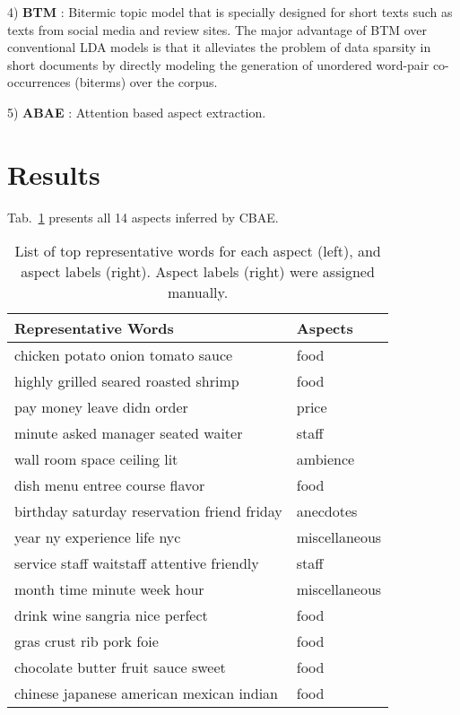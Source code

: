 \documentclass{article}
\begin{document}
4) \textbf{BTM} \cite{Yan2013}: Bitermic topic model that is specially designed for short texts such as texts from social media and review sites. The major advantage of BTM over conventional LDA models is that it alleviates the problem of data sparsity in short documents by directly modeling the generation of unordered word-pair co-occurrences (biterms) over the corpus.

5) \textbf{ABAE} \cite{He2018ABAE}: Attention based aspect extraction.


\section{Results}
Tab.~\ref{tab:aspects} presents all 14 aspects inferred by CBAE.

\begin{table}[tbh!]
\begin{center}
\begin{tabular}[t]{l|l}
\hline
Representative Words & Aspects \\
\hline
chicken potato onion tomato sauce           & food          \\
highly grilled seared roasted shrimp        & food          \\
pay money leave didn order                  & price         \\
minute asked manager seated waiter          & staff         \\
wall room space ceiling lit                 & ambience      \\
dish menu entree course flavor              & food          \\
birthday saturday reservation friend friday & anecdotes     \\
year ny experience life nyc                 & miscellaneous \\
service staff waitstaff attentive friendly  & staff         \\
month time minute week hour                 & miscellaneous \\
drink wine sangria nice perfect             & food          \\
gras crust rib pork foie                    & food          \\
chocolate butter fruit sauce sweet          & food          \\
chinese japanese american mexican indian    & food          \\
\hline
\end{tabular}
\caption{List of top representative words for each aspect (left), and aspect labels (right). Aspect labels (right) were assigned manually.}
\label{tab:aspects}
\end{center}
\end{table}
\end{document}
